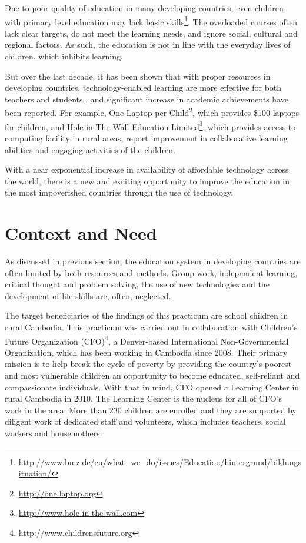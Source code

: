 Due to poor quality of education in many developing countries, even children with primary level education may lack basic skills\footnote{\url{http://www.bmz.de/en/what\_we\_do/issues/Education/hintergrund/bildungsituation/}}. The overloaded courses often lack clear targets, do not meet the learning needs, and ignore social, cultural and regional factors. As such, the education is not in line with the everyday lives of children, which inhibits learning. 

But over the last decade, it has been shown that with proper resources in developing countries, technology-enabled learning are more effective for both teachers and students \citep{Bransford00whencomputer,fisher2010technology}, and significant increase in academic achievements have been reported. For example, One Laptop per Child\footnote{\url{http://one.laptop.org}}, which provides \$100 laptops for children, 
and Hole-in-The-Wall Education Limited\footnote{\url{http://www.hole-in-the-wall.com}}, which provides access to computing facility in rural areas, report improvement in collaborative learning abilities and engaging activities of the children. 

With a near exponential increase in availability of affordable technology across the world, there is a new and exciting opportunity to improve the education in the most impoverished countries through the use of technology.

\section{Context and Need}

As discussed in previous section, the education system in developing countries are often limited by both resources and methods. Group work, independent learning, critical thought and problem solving, the use of new technologies and the development of life skills are, often, neglected. 

The target beneficiaries of the findings of this practicum are school children in rural Cambodia. This practicum was carried out in collaboration with Children's Future Organization (CFO)\footnote{\url{http://www.childrensfuture.org}}, a Denver-based International Non-Governmental Organization, which has been working in Cambodia since 2008. Their primary mission is to help break the cycle of poverty by providing the country’s poorest and most vulnerable children an opportunity to become educated, self-reliant and compassionate individuals.
With that in mind, CFO opened a Learning Center in rural Cambodia in 2010. The Learning Center is the nucleus for all of CFO's work in the area. More than 230 children are enrolled and they are supported by diligent work of dedicated staff and volunteers, which includes teachers, social workers and housemothers.

